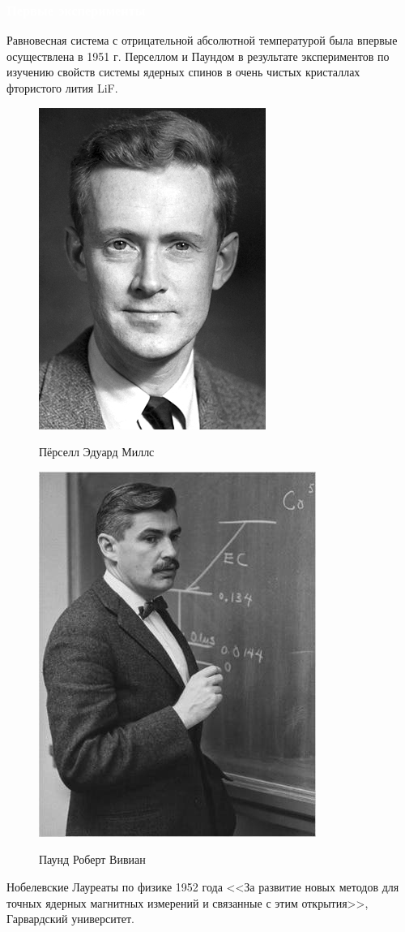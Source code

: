 \documentclass[aspectratio=169]{beamer}
\begin{document}
\begin{frame}
\frametitle{\textcolor{white}{Первые эксперименты}} 
\vspace{0.1cm}
Равновесная система с отрицательной абсолютной температурой была впервые осуществлена в 1951 г. Перселлом и Паундом в результате экспериментов по изучению свойств системы ядерных спинов в очень чистых кристаллах фтористого лития LiF.
\begin{figure}
\centering
\begin{minipage}{.5\textwidth}
  \centering
  \includegraphics[width=.405\linewidth]{Purcell}

	Пёрселл Эдуард Миллс 


  \label{fig:test1}
\end{minipage}%
\hfill
\begin{minipage}{.5\textwidth}
  \centering
  \includegraphics[width=.4377\linewidth]{Pound}

	Паунд Роберт Вивиан
  \label{fig:test2}
\end{minipage}
\end{figure}
\small{
Нобелевские Лауреаты по физике 1952 года <<За развитие новых методов для точных ядерных магнитных измерений и связанные с этим открытия>>, Гарвардский университет.}
\end{frame}
\end{document}
